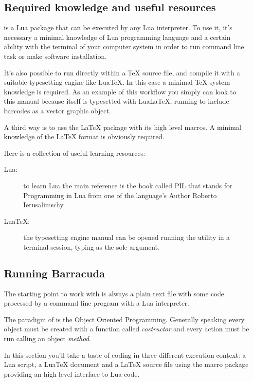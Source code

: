 \documentclass[11pt,a4paper]{article}
\begin{document}
\subsection{Required knowledge and useful resources}

\brcd{} is a Lua package that can be executed by any Lua interpreter. To use it,
it's necessary a minimal knowledge of Lua programming language and a certain
ability with the terminal of your computer system in order to run command line
task or make software installation.

It's also possible to run \brcd{} directly within a \TeX{} source file, and
compile it with a suitable typesetting engine like Lua\TeX{}. In this case a
minimal \TeX{} system knowledge is required. As an example of this workflow you
simply can look to this manual because itself is typesetted with LuaLa\TeX{},
running \brcd{} to include barcodes as a vector graphic object.

A third way is to use the \LaTeX{} package  with its high
level macros. A minimal knowledge of the \LaTeX{} format is obviously required.

Here is a collection of useful learning resources:
\begin{description}
\item[Lua:] to learn Lua the main reference is the book called PIL that stands
for Programming in Lua from one of the language's Author Roberto Ierusalimschy.
\item[Lua\TeX:] the typesetting engine manual can be opened running the
 utility in a terminal session, typing  as the sole
argument.
\end{description}


\subsection{Running Barracuda}
\label{secEnter}

The starting point to work with \brcd{} is always a plain text file with some
code processed by a command line program with a Lua interpreter.

The paradigm of \brcd{} is the Object Oriented Programming. Generally speaking
every object must be created with a function called \emph{costructor} and every
action must be run calling an object \emph{method}.

In this section you'll take a taste of \brcd{} coding in three different
execution context: a Lua script, a Lua\TeX{} document and a \LaTeX{} source file
using the macro package  providing an high level interface
to Lua code.
\end{document}
